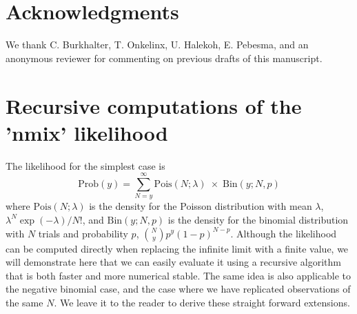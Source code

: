 \documentclass[codesnippet]{jss}
\begin{document}
\section*{Acknowledgments}
We thank C. Burkhalter, T. Onkelinx, U. Halekoh, E. Pebesma, and an anonymous reviewer for commenting on previous drafts of this manuscript.



\appendix
\section{Recursive computations of the 'nmix' likelihood}
The likelihood for the simplest case is
\begin{displaymath}
	\text{Prob}(y) = \sum_{N = y}^{\infty}
	\text{Pois}(N ; \lambda) \;\times\; \text{Bin}(y;  N, p)
\end{displaymath}
where $\text{Pois}(N; \lambda)$ is the density for the Poisson distribution with mean $\lambda$, $\lambda^{N}\exp(-\lambda)/N!$, and $\text{Bin}(y; N, p)$ is the density for the binomial distribution with $N$ trials and probability $p$, ${N \choose y} p^{y}(1-p)^{N-p}$. Although the likelihood can be computed directly when replacing the infinite limit with a finite value, we will demonstrate here that we can easily evaluate it using a recursive algorithm that is both faster and more numerical stable. The same idea is also applicable to the negative binomial case, and the case where we have replicated observations of the same $N$. We leave it to the reader to derive these straight forward extensions.
\end{document}
